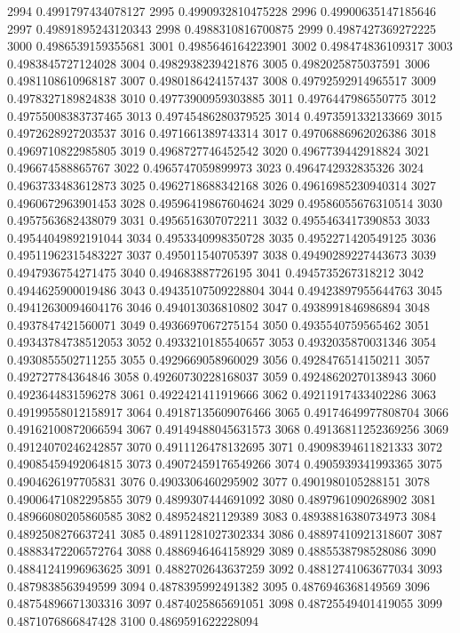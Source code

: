 2994 0.4991797434078127
2995 0.4990932810475228
2996 0.49900635147185646
2997 0.49891895243120343
2998 0.4988310816700875
2999 0.4987427369272225
3000 0.4986539159355681
3001 0.4985646164223901
3002 0.498474836109317
3003 0.4983845727124028
3004 0.4982938239421876
3005 0.4982025875037591
3006 0.4981108610968187
3007 0.4980186424157437
3008 0.49792592914965517
3009 0.4978327189824838
3010 0.49773900959303885
3011 0.4976447986550775
3012 0.49755008383737465
3013 0.49745486280379525
3014 0.4973591332133669
3015 0.4972628927203537
3016 0.4971661389743314
3017 0.49706886962026386
3018 0.4969710822985805
3019 0.4968727746452542
3020 0.4967739442918824
3021 0.496674588865767
3022 0.4965747059899973
3023 0.4964742932835326
3024 0.4963733483612873
3025 0.4962718688342168
3026 0.49616985230940314
3027 0.4960672963901453
3028 0.49596419867604624
3029 0.49586055676310514
3030 0.4957563682438079
3031 0.4956516307072211
3032 0.4955463417390853
3033 0.49544049892191044
3034 0.4953340998350728
3035 0.4952271420549125
3036 0.49511962315483227
3037 0.495011540705397
3038 0.49490289227443673
3039 0.4947936754271475
3040 0.494683887726195
3041 0.4945735267318212
3042 0.4944625900019486
3043 0.49435107509228804
3044 0.49423897955644763
3045 0.49412630094604176
3046 0.494013036810802
3047 0.4938991846986894
3048 0.4937847421560071
3049 0.4936697067275154
3050 0.4935540759565462
3051 0.49343784738512053
3052 0.4933210185540657
3053 0.4932035870031346
3054 0.4930855502711255
3055 0.4929669058960029
3056 0.4928476514150211
3057 0.492727784364846
3058 0.49260730228168037
3059 0.49248620270138943
3060 0.4923644831596278
3061 0.4922421411919666
3062 0.49211917433402286
3063 0.49199558012158917
3064 0.49187135609076466
3065 0.49174649977808704
3066 0.49162100872066594
3067 0.49149488045631573
3068 0.49136811252369256
3069 0.49124070246242857
3070 0.4911126478132695
3071 0.49098394611821333
3072 0.49085459492064815
3073 0.49072459176549266
3074 0.4905939341993365
3075 0.4904626197705831
3076 0.4903306460295902
3077 0.4901980105288151
3078 0.49006471082295855
3079 0.4899307444691092
3080 0.4897961090268902
3081 0.48966080205860585
3082 0.489524821129389
3083 0.48938816380734973
3084 0.4892508276637241
3085 0.48911281027302334
3086 0.48897410921318607
3087 0.48883472206572764
3088 0.4886946464158929
3089 0.4885538798528086
3090 0.48841241996963625
3091 0.4882702643637259
3092 0.48812741063677034
3093 0.4879838563949599
3094 0.4878395992491382
3095 0.4876946368149569
3096 0.48754896671303316
3097 0.4874025865691051
3098 0.48725549401419055
3099 0.4871076866847428
3100 0.4869591622228094
